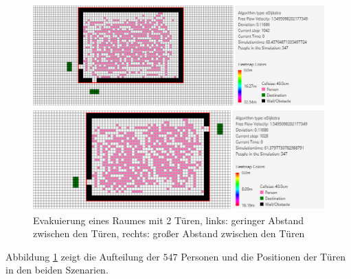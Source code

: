 \begin{figure}[!htb]
	\centering
	\begin{minipage}{.5\textwidth}
		\centering
		\includegraphics[width=\textwidth]{abbildungen/Evak2TMinDis2.PNG}
	\end{minipage}%
	\begin{minipage}{0.5\textwidth}
		\centering
		\includegraphics[width=\textwidth]{abbildungen/Evak2TMaxDis2.PNG}
	\end{minipage}
	\caption{Evakuierung eines Raumes mit 2 Türen, links: geringer Abstand zwischen den Türen, rechts: großer Abstand zwischen den Türen}
	\label{fig:Evak2TminmaxDis2}
\end{figure}

Abbildung \ref{fig:Evak2TminmaxDis2} zeigt die Aufteilung der $547$ Personen und die Positionen der Türen in den beiden Szenarien. 

